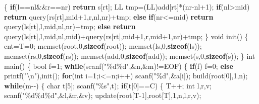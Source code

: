 \documentclass[
]{article}
\newenvironment{Shaded}{}{}
\newcommand{\CharTok}[1]{\textcolor[rgb]{0.25,0.44,0.63}{#1}}
\newcommand{\ControlFlowTok}[1]{\textcolor[rgb]{0.00,0.44,0.13}{\textbf{#1}}}
\newcommand{\DataTypeTok}[1]{\textcolor[rgb]{0.56,0.13,0.00}{#1}}
\newcommand{\DecValTok}[1]{\textcolor[rgb]{0.25,0.63,0.44}{#1}}
\newcommand{\KeywordTok}[1]{\textcolor[rgb]{0.00,0.44,0.13}{\textbf{#1}}}
\newcommand{\NormalTok}[1]{#1}
\newcommand{\SpecialCharTok}[1]{\textcolor[rgb]{0.25,0.44,0.63}{#1}}
\newcommand{\StringTok}[1]{\textcolor[rgb]{0.25,0.44,0.63}{#1}}
\begin{document}
\begin{Shaded}
\begin{Highlighting}[]
\NormalTok{\{}
    \ControlFlowTok{if}\NormalTok{(l==nl\&\&r==nr) }\ControlFlowTok{return}\NormalTok{ s[rt];}
\NormalTok{    LL tmp=(LL)add[rt]*(nr{-}nl+}\DecValTok{1}\NormalTok{);}
    \ControlFlowTok{if}\NormalTok{(nl\textgreater{}mid) }\ControlFlowTok{return}\NormalTok{ query(rs[rt],mid+}\DecValTok{1}\NormalTok{,r,nl,nr)+tmp;}
    \ControlFlowTok{else} \ControlFlowTok{if}\NormalTok{(nr\textless{}=mid) }\ControlFlowTok{return}\NormalTok{ query(ls[rt],l,mid,nl,nr)+tmp;}
    \ControlFlowTok{else} \ControlFlowTok{return}\NormalTok{ query(ls[rt],l,mid,nl,mid)+query(rs[rt],mid+}\DecValTok{1}\NormalTok{,r,mid+}\DecValTok{1}\NormalTok{,nr)+tmp;}
\NormalTok{\}}
\DataTypeTok{void}\NormalTok{ init()}
\NormalTok{\{}
\NormalTok{    cnt=T=}\DecValTok{0}\NormalTok{;}
\NormalTok{    memset(root,}\DecValTok{0}\NormalTok{,}\KeywordTok{sizeof}\NormalTok{(root));}
\NormalTok{    memset(ls,}\DecValTok{0}\NormalTok{,}\KeywordTok{sizeof}\NormalTok{(ls));}
\NormalTok{    memset(rs,}\DecValTok{0}\NormalTok{,}\KeywordTok{sizeof}\NormalTok{(rs));}
\NormalTok{    memset(add,}\DecValTok{0}\NormalTok{,}\KeywordTok{sizeof}\NormalTok{(add));}
\NormalTok{    memset(s,}\DecValTok{0}\NormalTok{,}\KeywordTok{sizeof}\NormalTok{(s));}
\NormalTok{\}}
\DataTypeTok{int}\NormalTok{ main()}
\NormalTok{\{}
    \DataTypeTok{bool}\NormalTok{ f=}\DecValTok{1}\NormalTok{;}
    \ControlFlowTok{while}\NormalTok{(scanf(}\StringTok{"}\SpecialCharTok{\%d\%d}\StringTok{"}\NormalTok{,\&n,\&m)!=EOF)}
\NormalTok{    \{}
        \ControlFlowTok{if}\NormalTok{(f) f=}\DecValTok{0}\NormalTok{;}
        \ControlFlowTok{else}\NormalTok{ printf(}\StringTok{"}\SpecialCharTok{\textbackslash{}n}\StringTok{"}\NormalTok{),init();}
        \ControlFlowTok{for}\NormalTok{(}\DataTypeTok{int}\NormalTok{ i=}\DecValTok{1}\NormalTok{;i\textless{}=n;i++) scanf(}\StringTok{"}\SpecialCharTok{\%d}\StringTok{"}\NormalTok{,\&a[i]);}
\NormalTok{        build(root[}\DecValTok{0}\NormalTok{],}\DecValTok{1}\NormalTok{,n);}
        \ControlFlowTok{while}\NormalTok{(m{-}{-})}
\NormalTok{        \{}
            \DataTypeTok{char}\NormalTok{ t[}\DecValTok{5}\NormalTok{]; scanf(}\StringTok{"}\SpecialCharTok{\%s}\StringTok{"}\NormalTok{,t);}
            \ControlFlowTok{if}\NormalTok{(t[}\DecValTok{0}\NormalTok{]==}\CharTok{\textquotesingle{}C\textquotesingle{}}\NormalTok{)}
\NormalTok{            \{}
\NormalTok{                T++;}
                \DataTypeTok{int}\NormalTok{ l,r,v; scanf(}\StringTok{"}\SpecialCharTok{\%d\%d\%d}\StringTok{"}\NormalTok{,\&l,\&r,\&v);}
\NormalTok{                update(root[T{-}}\DecValTok{1}\NormalTok{],root[T],}\DecValTok{1}\NormalTok{,n,l,r,v);}

\end{Highlighting}
\end{Shaded}
\end{document}
